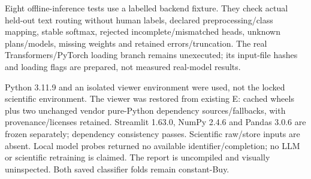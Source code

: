 Eight offline-inference tests use a labelled backend fixture. They check actual held-out text routing without human labels, declared preprocessing/class mapping, stable softmax, rejected incomplete/mismatched heads, unknown plans/models, missing weights and retained errors/truncation. The real Transformers/PyTorch loading branch remains unexecuted; its input-file hashes and loading flags are prepared, not measured real-model results.

Python 3.11.9 and an isolated viewer environment were used, not the locked scientific environment. The viewer was restored from existing E: cached wheels plus two unchanged vendor pure-Python dependency sources/fallbacks, with provenance/licenses retained. Streamlit 1.63.0, NumPy 2.4.6 and Pandas 3.0.6 are frozen separately; dependency consistency passes. Scientific raw/store inputs are absent. Local model probes returned no available identifier/completion; no LLM or scientific retraining is claimed. The report is uncompiled and visually uninspected. Both saved classifier folds remain constant-Buy.
